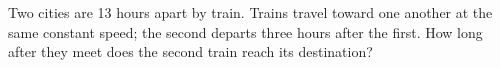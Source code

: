 Two cities are 13 hours apart by train. Trains travel toward one another at the same constant speed; the second departs three hours after the first. How long after they meet does the second train reach its destination?
